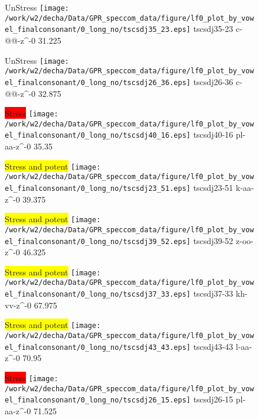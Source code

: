 \documentclass{article}
\begin{document}
\begin{figure}[t]
\begin{minipage}[b]{.24\textwidth}
UnStress
\centering
\texttt{[image: /work/w2/decha/Data/GPR\_speccom\_data/figure/lf0\_plot\_by\_vowel\_finalconsonant/0\_long\_no/tscsdj35\_23.eps]}
tscsdj35-23 c-@@-z\textasciicircum-0 31.225
\end{minipage}
\begin{minipage}[b]{.24\textwidth}
UnStress
\centering
\texttt{[image: /work/w2/decha/Data/GPR\_speccom\_data/figure/lf0\_plot\_by\_vowel\_finalconsonant/0\_long\_no/tscsdj26\_36.eps]}
tscsdj26-36 c-@@-z\textasciicircum-0 32.875
\end{minipage}
\begin{minipage}[b]{.24\textwidth}
\colorbox{red}{Stress}
\centering
\texttt{[image: /work/w2/decha/Data/GPR\_speccom\_data/figure/lf0\_plot\_by\_vowel\_finalconsonant/0\_long\_no/tscsdj40\_16.eps]}
tscsdj40-16 pl-aa-z\textasciicircum-0 35.35
\end{minipage}
\begin{minipage}[b]{.24\textwidth}
\colorbox{yellow}{Stress and potent}
\centering
\texttt{[image: /work/w2/decha/Data/GPR\_speccom\_data/figure/lf0\_plot\_by\_vowel\_finalconsonant/0\_long\_no/tscsdj23\_51.eps]}
tscsdj23-51 k-aa-z\textasciicircum-0 39.375
\end{minipage}
\end{figure}
\clearpage
\begin{figure}[t]
\begin{minipage}[b]{.24\textwidth}
\colorbox{yellow}{Stress and potent}
\centering
\texttt{[image: /work/w2/decha/Data/GPR\_speccom\_data/figure/lf0\_plot\_by\_vowel\_finalconsonant/0\_long\_no/tscsdj39\_52.eps]}
tscsdj39-52 z-oo-z\textasciicircum-0 46.325
\end{minipage}
\begin{minipage}[b]{.24\textwidth}
\colorbox{yellow}{Stress and potent}
\centering
\texttt{[image: /work/w2/decha/Data/GPR\_speccom\_data/figure/lf0\_plot\_by\_vowel\_finalconsonant/0\_long\_no/tscsdj37\_33.eps]}
tscsdj37-33 kh-vv-z\textasciicircum-0 67.975
\end{minipage}
\begin{minipage}[b]{.24\textwidth}
\colorbox{yellow}{Stress and potent}
\centering
\texttt{[image: /work/w2/decha/Data/GPR\_speccom\_data/figure/lf0\_plot\_by\_vowel\_finalconsonant/0\_long\_no/tscsdj43\_43.eps]}
tscsdj43-43 l-aa-z\textasciicircum-0 70.95
\end{minipage}
\begin{minipage}[b]{.24\textwidth}
\colorbox{red}{Stress}
\centering
\texttt{[image: /work/w2/decha/Data/GPR\_speccom\_data/figure/lf0\_plot\_by\_vowel\_finalconsonant/0\_long\_no/tscsdj26\_15.eps]}
tscsdj26-15 pl-aa-z\textasciicircum-0 71.525
\end{minipage}
\end{figure}
\end{document}
